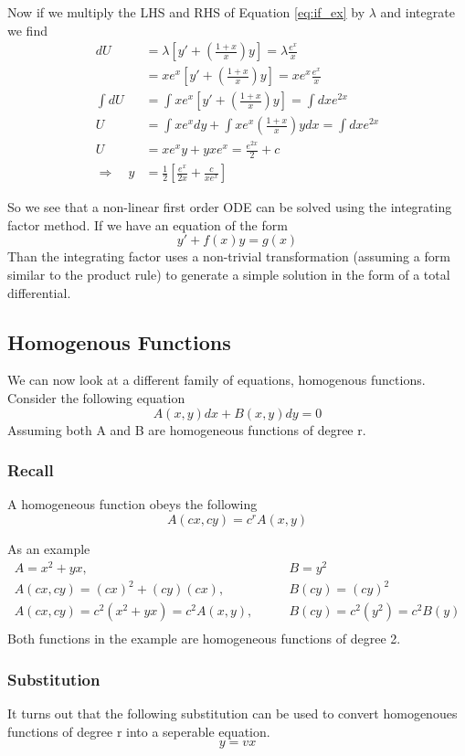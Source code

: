 \documentclass{article}
\newcommand{\be}{\begin{equation}}
\newcommand{\ee}{\end{equation}}
\begin{document}
Now if we multiply the LHS and RHS of Equation \ref{eq:if_ex} by $\lambda$ and integrate we find
\be
\begin{split}
	dU &= \lambda\left[y' + \left(\frac{1+x}{x}\right)y\right] = \lambda\frac{e^x}{x} \\
    &= xe^x\left[y' + \left(\frac{1+x}{x}\right)y\right] = xe^x\frac{e^x}{x} \\
    \int dU &= \int xe^x\left[y' + \left(\frac{1+x}{x}\right) y\right] = \int dx e^{2x}\\
    U &= \int xe^x dy + \int  xe^x\left(\frac{1+x}{x}\right) y dx = \int dx e^{2x}\\
    U &=  xe^x y + y  xe^x = \frac{e^{2x}}{2} + c\\
	\Rightarrow \quad y &= \frac{1}{2}\left[\frac{e^x}{2x} + \frac{c}{xe^x}\right]
\end{split}
\ee

So we see that a non-linear first order ODE can be solved using the integrating factor method.
If we have an equation of the form
\be
y' + f(x)y = g(x)
\ee
Than the integrating factor uses a non-trivial transformation (assuming a form similar to the product rule) to generate a simple solution in the form of a total differential. 

\subsection*{Homogenous Functions}
We can now look at a different family of equations, homogenous functions.
Consider the following equation
\be
A(x,y)dx + B(x,y)dy = 0
\ee
Assuming both A and B are homogeneous functions of degree r.

\subsubsection*{Recall}
A homogeneous function obeys the following
\be
A(cx,cy) = c^r A(x,y)
\ee

As an example
\be
\begin{split}
    A = x^2 + yx, &\qquad B = y^2\\
    A(cx,cy) = (cx)^2 + (cy)(cx), &\qquad B(cy) = (cy)^2\\
    A(cx,cy) = c^2\left(x^2 + yx\right) = c^2A(x,y), &\qquad B(cy) = c^2\left(y^2\right) = c^2 B(y)\\
\end{split}
\ee
Both functions in the example are homogeneous functions of degree 2. 

\subsubsection*{Substitution}
It turns out that the following substitution can be used to convert homogenoues functions of degree r into a seperable equation.
\be
y = vx
\ee
\end{document}
